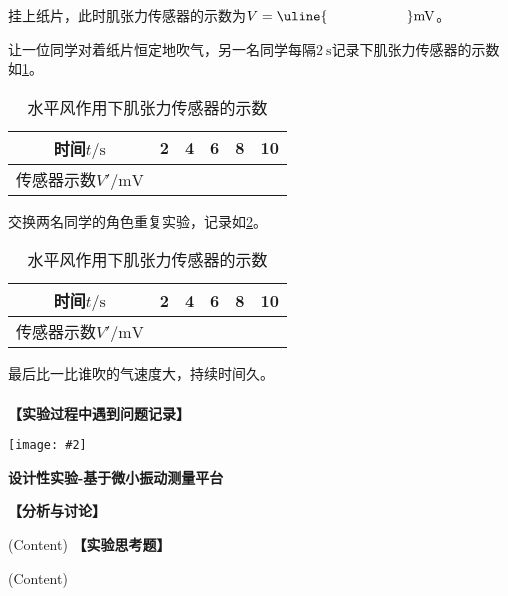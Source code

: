 \documentclass[11pt,a4paper]{ctexart}
\newcommand{\ExpeName}{设计性实验-基于微小振动测量平台}
\newcommand{\cpic}[2]{
\begin{center}
\texttt{[image: \#2]}
\end{center}
}
\newcommand{\emptyline}{\\ \ \\}
\begin{document}
\par
挂上纸片，此时肌张力传感器的示数为$V =\uline{\hspace{2cm}} \mathrm{mV}$。
\par
让一位同学对着纸片恒定地吹气，另一名同学每隔$2\mathrm{\ s}$记录下肌张力传感器的示数如\cref{table8}。
\begin{table}[H]
\centering
\caption{水平风作用下肌张力传感器的示数}
\label{table8}
\begin{tabular}{|c|p{12mm}|p{12mm}|p{12mm}|p{12mm}|p{12mm}|}
\hline
时间$t \mathrm{/s}$ & 2 & 4& 6 & 8 & 10  \\ \hline
传感器示数$V'/\mathrm{mV}$ &  &  &  &  & \\ \hline
\end{tabular}
\end{table}
\par
交换两名同学的角色重复实验，记录如\cref{table9}。
\begin{table}[H]
\centering
\caption{水平风作用下肌张力传感器的示数}
\label{table9}
\begin{tabular}{|c|p{12mm}|p{12mm}|p{12mm}|p{12mm}|p{12mm}|}
\hline
时间$t \mathrm{/s}$ & 2 & 4& 6 & 8 & 10  \\ \hline
传感器示数$V'/\mathrm{mV}$ &  &  &  &  & \\ \hline
\end{tabular}
\end{table}
最后比一比谁吹的气速度大，持续时间久。
\emptyline
\textbf{【实验过程中遇到问题记录】}

%

\newpage%
\cpic{0.255}{e3}%
\begin{center}
\LARGE\textbf{{\ExpeName}}
\end{center}
\textbf{【分析与讨论】}\par
(Content)
\newline
\textbf{【实验思考题】}\par
(Content)
\end{document}
